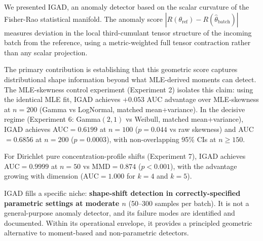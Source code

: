 \documentclass[12pt]{article}
\begin{document}
We presented IGAD, an anomaly detector based on the scalar curvature of the
Fisher-Rao statistical manifold. The anomaly score
$|R(\theta_{\mathrm{ref}}) - R(\hat{\theta}_{\mathrm{batch}})|$ measures
deviation in the local third-cumulant tensor structure of the incoming batch from
the reference, using a metric-weighted full tensor contraction rather than any
scalar projection.

The primary contribution is establishing that this geometric score captures
distributional shape information beyond what MLE-derived moments can detect. The
MLE-skewness control experiment (Experiment 2) isolates this claim: using the
identical MLE fit, IGAD achieves $+0.053$ AUC advantage over MLE-skewness at
$n=200$ (Gamma vs LogNormal, matched mean+variance). In the decisive regime
(Experiment 6: Gamma$(2,1)$ vs Weibull, matched mean+variance), IGAD achieves
AUC$=0.6199$ at $n=100$ ($p=0.044$ vs raw skewness) and AUC$=0.6856$ at $n=200$
($p=0.0003$), with non-overlapping 95\% CIs at $n\geq 150$.

For Dirichlet pure concentration-profile shifts (Experiment 7), IGAD achieves
AUC$=0.9999$ at $n=50$ vs MMD$=0.874$ ($p<0.001$), with the advantage growing
with dimension (AUC$=1.000$ for $k=4$ and $k=5$).

IGAD fills a specific niche: \textbf{shape-shift detection in
correctly-specified parametric settings at moderate $n$} (50--300 samples per
batch). It is not a general-purpose anomaly detector, and its failure modes are
identified and documented. Within its operational envelope, it provides a
principled geometric alternative to moment-based and non-parametric detectors.
\end{document}
